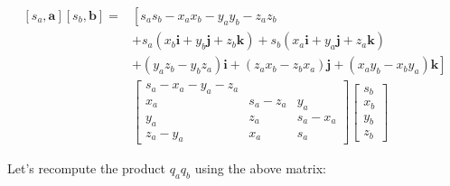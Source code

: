     $$
        \begin{aligned}
            {\left[s_{a}, \mathbf{a}\right]\left[s_{b}, \mathbf{b}\right]=} & {\left[s_{a} s_{b}-x_{a} x_{b}-y_{a} y_{b}-z_{a} z_{b}\right.}                                                                                                \\
                                                                            & +s_{a}\left(x_{b} \mathbf{i}+y_{b} \mathbf{j}+z_{b} \mathbf{k}\right)+s_{b}\left(x_{a} \mathbf{i}+y_{a} \mathbf{j}+z_{a} \mathbf{k}\right)                    \\
                                                                            & \left.+\left(y_{a} z_{b}-y_{b} z_{a}\right) \mathbf{i}+\left(z_{a} x_{b}-z_{b} x_{a}\right) \mathbf{j}+\left(x_{a} y_{b}-x_{b} y_{a}\right) \mathbf{k}\right] \\
                                                                            & {\left[\begin{array}{rrr}
                            s_{a}-x_{a}-y_{a}-z_{a}                 \\
                            x_{a}       & s_{a}-z_{a} & y_{a}       \\
                            y_{a}       & z_{a}       & s_{a}-x_{a} \\
                            z_{a}-y_{a} & x_{a}       & s_{a}
                        \end{array}\right]\left[\begin{array}{c}
                            s_{b} \\
                            x_{b} \\
                            y_{b} \\
                            z_{b}
                        \end{array}\right] }
        \end{aligned}
    $$

    Let's recompute the product $q_{a} q_{b}$ using the above matrix:

